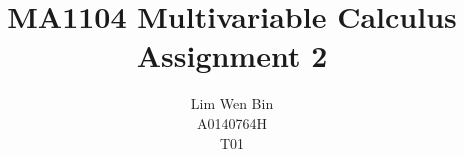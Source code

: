 \documentclass[12pt]{article}
\newenvironment{problem}[2][Problem]{\begin{trivlist}
	\item[\hskip \labelsep {\bfseries #1}\hskip \labelsep {\bfseries #2.}]}{\end{trivlist}}
\begin{document}
\title{MA1104 Multivariable Calculus Assignment 2}
\author{Lim Wen Bin \\
	A0140764H\\
	T01}
\maketitle

\begin{problem}{1}
\end{problem}
\begin{align*}
\end{align*}
\filbreak
\end{document}
